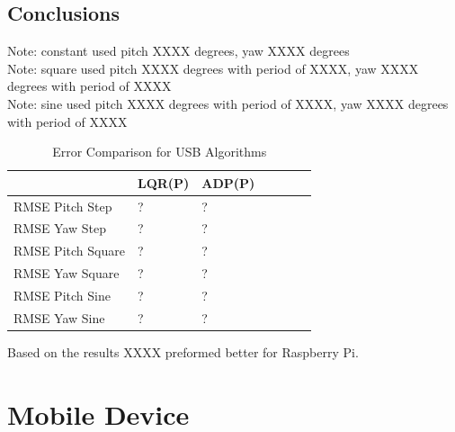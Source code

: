 \subsection{Conclusions}
Note: constant used pitch XXXX degrees, yaw XXXX degrees\\
Note: square used pitch XXXX degrees with period of XXXX, yaw XXXX degrees with period of XXXX\\
Note: sine used pitch XXXX degrees with period of XXXX, yaw XXXX degrees with period of XXXX\\
\begin{table}[h!]
    \centering
    \begin{tabular}{l|l|l|l|l|l|l}
        \toprule
        \textbf{} & \textbf{LQR(P)} & \textbf{ADP(P)} \\
        \toprule
        RMSE Pitch Step & ? & ?  \\
        RMSE Yaw Step & ? & ? \\
        RMSE Pitch Square & ? & ? \\
        RMSE Yaw Square & ? & ? \\
        RMSE Pitch Sine & ? & ? \\
        RMSE Yaw Sine & ? & ? \\
        \bottomrule
    \end{tabular}
    \caption{Error Comparison for USB Algorithms}
    \label{tab:USB_RMSE}
\end{table}
Based on the results XXXX preformed better for Raspberry Pi.

\section{Mobile Device}

